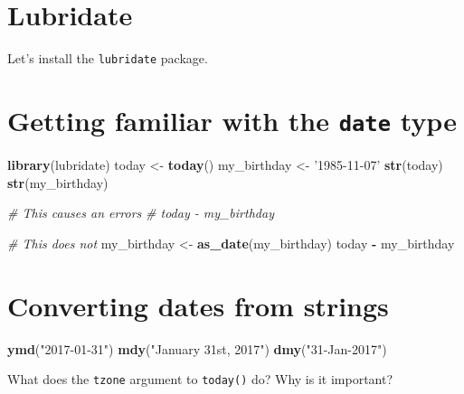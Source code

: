 \documentclass[
]{book}
\newenvironment{Shaded}{\begin{snugshade}}{\end{snugshade}}
\newcommand{\CommentTok}[1]{\textcolor[rgb]{0.56,0.35,0.01}{\textit{#1}}}
\newcommand{\KeywordTok}[1]{\textcolor[rgb]{0.13,0.29,0.53}{\textbf{#1}}}
\newcommand{\NormalTok}[1]{#1}
\newcommand{\OperatorTok}[1]{\textcolor[rgb]{0.81,0.36,0.00}{\textbf{#1}}}
\newcommand{\StringTok}[1]{\textcolor[rgb]{0.31,0.60,0.02}{#1}}
\begin{document}
\hypertarget{lubridate}{%
\section*{Lubridate}\label{lubridate}}

Let's install the \texttt{lubridate} package.

\hypertarget{getting-familiar-with-the-date-type}{%
\section*{\texorpdfstring{Getting familiar with the \texttt{date} type}{Getting familiar with the date type}}\label{getting-familiar-with-the-date-type}}

\begin{Shaded}
\begin{Highlighting}[]
\KeywordTok{library}\NormalTok{(lubridate)}
\NormalTok{today <-}\StringTok{ }\KeywordTok{today}\NormalTok{()}
\NormalTok{my_birthday <-}\StringTok{ '1985-11-07'}
\KeywordTok{str}\NormalTok{(today)}
\KeywordTok{str}\NormalTok{(my_birthday)}

\CommentTok{# This causes an errors}
\CommentTok{# today - my_birthday}

\CommentTok{# This does not}
\NormalTok{my_birthday <-}\StringTok{ }\KeywordTok{as_date}\NormalTok{(my_birthday)}
\NormalTok{today }\OperatorTok{-}\StringTok{ }\NormalTok{my_birthday}
\end{Highlighting}
\end{Shaded}

\hypertarget{converting-dates-from-strings}{%
\section*{Converting dates from strings}\label{converting-dates-from-strings}}

\begin{Shaded}
\begin{Highlighting}[]
\KeywordTok{ymd}\NormalTok{(}\StringTok{"2017-01-31"}\NormalTok{)}
\KeywordTok{mdy}\NormalTok{(}\StringTok{"January 31st, 2017"}\NormalTok{)}
\KeywordTok{dmy}\NormalTok{(}\StringTok{"31-Jan-2017"}\NormalTok{)}
\end{Highlighting}
\end{Shaded}

What does the \texttt{tzone} argument to \texttt{today()} do? Why is it important?
\end{document}
